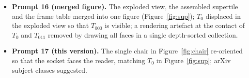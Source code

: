 \documentclass[11pt,a4paper]{article}
\theoremstyle{plain}
\theoremstyle{definition}
\begin{document}
\begin{itemize}
\item \textbf{Prompt 16 (merged figure).} The exploded view, the assembled supertile and the frame table merged into one figure (Figure~\ref{fig:sup}); $T_0$ displaced in the exploded view so that $T_{000}$ is visible; a rendering artefact at the contact of $T_0$ and $T_{011}$ removed by drawing all faces in a single depth-sorted collection.

\item \textbf{Prompt 17 (this version).} The single chair in Figure~\ref{fig:chair} re-oriented so that the socket faces the reader, matching $T_0$ in Figure~\ref{fig:sup}; arXiv subject classes suggested.
\end{itemize}
\end{document}
